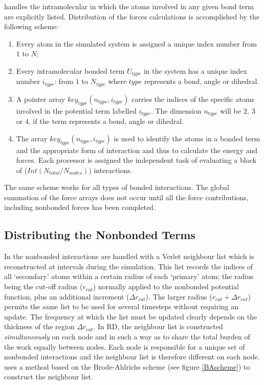 \D{} handles the intramolecular
in which the atoms involved in any given bond term are explicitly
listed. Distribution of the forces calculations is accomplished by the
following scheme:
\begin{enumerate}
\item Every atom in the simulated system is assigned a unique index
number from $1$ to $N$; 
\item Every intramolecular bonded term $U_{type}$ in the system has a 
unique index number $i_{type}$: from $1$ to $N_{type}$ where $type$
represents a bond, angle or dihedral.
\item A pointer array $key_{type}(n_{type},i_{type})$ carries the 
indices of the specific atoms involved in the potential term labelled
$i_{type}$. The dimension $n_{type}$ will be $2,~3$ or $4$, if the
term represents a bond, angle or dihedral.
\item The array $key_{type}(n_{type},i_{type})$ is used to identify
the atoms in a bonded term and the appropriate form of interaction and
thus to calculate the energy and forces.  Each processor is assigned
the independent task of evaluating a block of
($Int(N_{total}/N_{nodes})$) interactions.
\end{enumerate}

The same scheme works for all types of bonded interactions.  The
global summation of the force arrays does not occur until all the
force contributions, including nonbonded forces has been completed.

\subsection{Distributing the Nonbonded Terms}

In \D{} the nonbonded interactions are handled with a Verlet neighbour
list \cite{allen-89a} which is reconstructed at intervals during the
simulation. This list records the indices of all `secondary' atoms
within a certain radius of each `primary' atom; the radius being the
cut-off radius ($r_{cut}$) normally applied to the nonbonded potential
function, plus an additional increment ($\Delta r_{cut}$). The larger
radius ($r_{cut}+\Delta r_{cut}$) permits the same list to be used for
several timesteps without requiring an update.  The frequency at which
the list must be updated clearly depends on the thickness of the
region $\Delta r_{cut}$.  In RD, the neighbour list is constructed
{\em simultaneously} on each node and in such a way as to share the
total burden of the work equally between nodes. Each node is
responsible for a unique set of nonbonded interactions and the
neighbour list is therefore different on each node. \D{} uses a method
based on the Brode-Ahlrichs scheme 
\cite{brode-86a} (see figure \ref{BAscheme})
to construct the neighbour list. 

